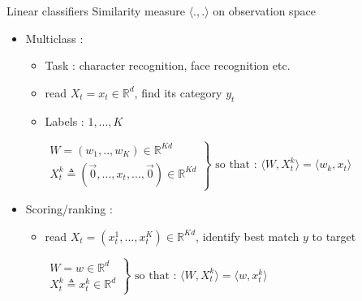 \documentclass{beamer}
\begin{document}
\begin{frame}{Linear classifiers}
	Similarity measure $\langle .,. \rangle$ on observation space
	\begin{itemize}
		\item Multiclass : 
		\begin{itemize}
			\item Task : character recognition, face recognition etc.
			\item read $X_t = x_t \in \mathbb{R}^d$, find its category $y_t$
			\item Labels : $1,...,K$
			\begin{exampleblock}{}
				$
				\left.
				\begin{array}{l}
				W = (w_1,..,w_K) \in \mathbb{R}^{K d}\\
				X_t^k \triangleq (\vec{0}, ...,  x_t, ..., \vec{0}) \in \mathbb{R}^{K d}
				\end{array}
				\right\}
				\text{ so that : }
				\langle W, X^k_t\rangle = \langle w_k, x_t\rangle
				$	
			\end{exampleblock}	
		\end{itemize}
		\item Scoring/ranking : 
		\begin{itemize}
			\item read $X_t = (x_t^1, ..., x_t^K) \in \mathbb{R}^{Kd}$, identify best match $y$ to target
			\begin{exampleblock}{}
				$
				\left.
				\begin{array}{l}
				W = w \in \mathbb{R}^{d}\\
				X_t^k \triangleq x_t^k \in \mathbb{R}^{d}
				\end{array}
				\right\}
				\text{ so that : }
				\langle W, X^k_t\rangle = \langle w, x_t^k\rangle
				$	
			\end{exampleblock}	
		\end{itemize}
	\end{itemize}

\end{frame}

	
\end{document}
